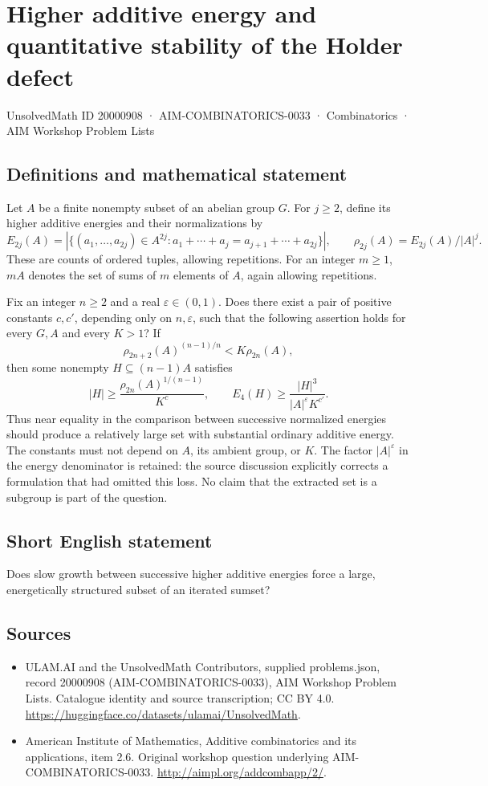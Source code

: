 \documentclass[11pt,a4paper]{article}
\begin{document}
\section*{Higher additive energy and quantitative stability of the Holder defect}\label{20000908}
{\small UnsolvedMath ID 20000908 · AIM-COMBINATORICS-0033 · Combinatorics · AIM Workshop Problem Lists}
\subsection{Definitions and mathematical statement}
Let $A$ be a finite nonempty subset of an abelian group $G$.
For $j\geq2$, define its higher additive energies and their normalizations by
\[
 E_{2j}(A)=|\{(a_1,\ldots,a_{2j})\in A^{2j}:
       a_1+\cdots+a_j=a_{j+1}+\cdots+a_{2j}\}|,
 \qquad \rho_{2j}(A)=E_{2j}(A)/|A|^j.
\]
These are counts of ordered tuples, allowing repetitions.
For an integer $m\geq1$, $mA$ denotes the set of sums of $m$ elements of $A$, again allowing repetitions.

Fix an integer $n\geq2$ and a real $\varepsilon\in(0,1)$.
Does there exist a pair of positive constants $c,c'$, depending only on $n,\varepsilon$, such that the following assertion holds for every $G,A$ and every $K>1$?
If
\[
 \rho_{2n+2}(A)^{(n-1)/n}<K\rho_{2n}(A),
\]
then some nonempty $H\subseteq(n-1)A$ satisfies
\[
 |H|\geq\frac{\rho_{2n}(A)^{1/(n-1)}}{K^c},
 \qquad E_4(H)\geq\frac{|H|^3}{|A|^{\varepsilon}K^{c'}}.
\]
Thus near equality in the comparison between successive normalized energies should produce a relatively large set with substantial ordinary additive energy.
The constants must not depend on $A$, its ambient group, or $K$.
The factor $|A|^{\varepsilon}$ in the energy denominator is retained: the source discussion explicitly corrects a formulation that had omitted this loss.
No claim that the extracted set is a subgroup is part of the question.
\subsection{Short English statement}
Does slow growth between successive higher additive energies force a large, energetically structured subset of an iterated sumset?
\subsection{Sources}
\begin{itemize}
\item[S1] ULAM.AI and the UnsolvedMath Contributors, supplied problems.json, record 20000908 (AIM-COMBINATORICS-0033), AIM Workshop Problem Lists. Catalogue identity and source transcription; CC BY 4.0.
\url{https://huggingface.co/datasets/ulamai/UnsolvedMath}.
\item[S2] American Institute of Mathematics, Additive combinatorics and its applications, item 2.6. Original workshop question underlying AIM-COMBINATORICS-0033.
\url{http://aimpl.org/addcombapp/2/}.
\end{itemize}
\end{document}
